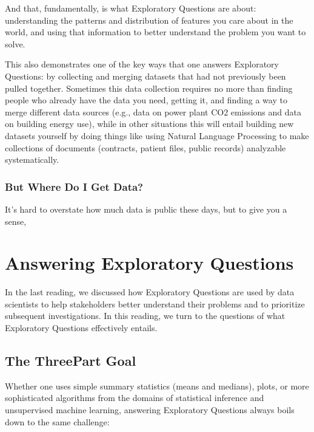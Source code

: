 \documentclass[letterpaper,10pt,english]{jupyterBook}
\begin{document}
\sphinxAtStartPar
And that, fundamentally, is what Exploratory Questions are about: understanding the patterns and distribution of features you care about in the world, and using that information to better understand the problem you want to solve.

\sphinxAtStartPar
This also demonstrates one of the key ways that one answers Exploratory Questions: by collecting and merging datasets that had not previously been pulled together. Sometimes this data collection requires no more than finding people who already have the data you need, getting it, and finding a way to merge different data sources (e.g., data on power plant CO2 emissions and data on building energy use), while in other situations this will entail building new datasets yourself by doing things like using Natural Language Processing to make collections of documents (contracts, patient files, public records) analyzable systematically.


\subsubsection{But Where Do I Get Data?}
\label{\detokenize{30_questions/10_using_exploratory_questions:but-where-do-i-get-data}}
\sphinxAtStartPar
It’s hard to overstate how much data is public these days, but to give you a sense, 

\sphinxstepscope


\section{Answering Exploratory Questions}
\label{\detokenize{30_questions/15_answering_exploratory_questions:answering-exploratory-questions}}\label{\detokenize{30_questions/15_answering_exploratory_questions::doc}}
\sphinxAtStartPar
In the last reading, we discussed how Exploratory Questions are used by data scientists to help stakeholders better understand their problems and to prioritize subsequent investigations. In this reading, we turn to the questions of what  Exploratory Questions effectively entails.


\subsection{The Three\sphinxhyphen{}Part Goal}
\label{\detokenize{30_questions/15_answering_exploratory_questions:the-three-part-goal}}
\sphinxAtStartPar
Whether one uses simple summary statistics (means and medians), plots, or more sophisticated algorithms from the domains of statistical inference and unsupervised machine learning, answering Exploratory Questions always boils down to the same challenge:
\end{document}

